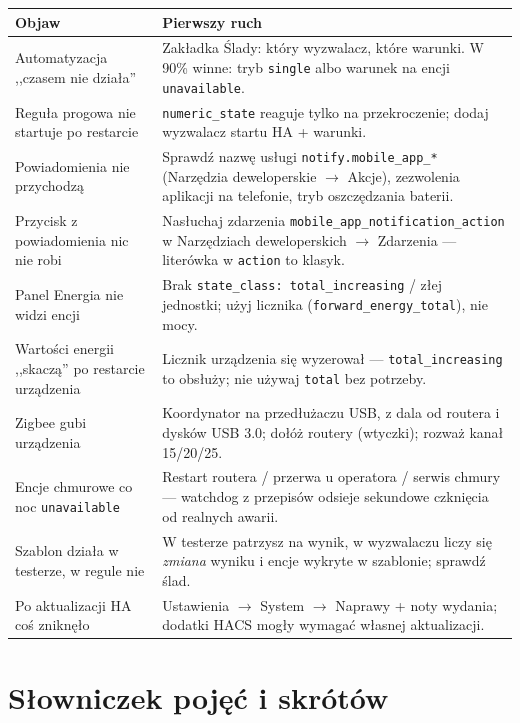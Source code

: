 \documentclass[11pt,a4paper]{article}
\begin{document}
\begin{longtable}{>{\raggedright\arraybackslash}p{4.6cm} >{\raggedright\arraybackslash}p{9.8cm}}
\toprule
\textbf{Objaw} & \textbf{Pierwszy ruch}\\
\midrule
\endhead
Automatyzacja ,,czasem nie działa'' & Zakładka Ślady: który wyzwalacz, które warunki. W 90\% winne: tryb \texttt{single} albo warunek na encji \texttt{unavailable}.\\
\addlinespace
Reguła progowa nie startuje po restarcie & \texttt{numeric\_state} reaguje tylko na przekroczenie; dodaj wyzwalacz startu HA + warunki.\\
\addlinespace
Powiadomienia nie przychodzą & Sprawdź nazwę usługi \texttt{notify.mobile\_app\_*} (Narzędzia deweloperskie $\to$ Akcje), zezwolenia aplikacji na telefonie, tryb oszczędzania baterii.\\
\addlinespace
Przycisk z powiadomienia nic nie robi & Nasłuchaj zdarzenia \texttt{mobile\_app\_notification\_action} w Narzędziach deweloperskich $\to$ Zdarzenia --- literówka w \texttt{action} to klasyk.\\
\addlinespace
Panel Energia nie widzi encji & Brak \texttt{state\_class: total\_increasing} / złej jednostki; użyj licznika (\texttt{forward\_energy\_total}), nie mocy.\\
\addlinespace
Wartości energii ,,skaczą'' po restarcie urządzenia & Licznik urządzenia się wyzerował --- \texttt{total\_increasing} to obsłuży; nie używaj \texttt{total} bez potrzeby.\\
\addlinespace
Zigbee gubi urządzenia & Koordynator na przedłużaczu USB, z dala od routera i dysków USB 3.0; dołóż routery (wtyczki); rozważ kanał 15/20/25.\\
\addlinespace
Encje chmurowe co noc \texttt{unavailable} & Restart routera / przerwa u operatora / serwis chmury --- watchdog z przepisów odsieje sekundowe czknięcia od realnych awarii.\\
\addlinespace
Szablon działa w testerze, w regule nie & W testerze patrzysz na wynik, w wyzwalaczu liczy się \emph{zmiana} wyniku i encje wykryte w szablonie; sprawdź ślad.\\
\addlinespace
Po aktualizacji HA coś zniknęło & Ustawienia $\to$ System $\to$ Naprawy + noty wydania; dodatki HACS mogły wymagać własnej aktualizacji.\\
\bottomrule
\end{longtable}

\section{Słowniczek pojęć i skrótów}
\end{document}
